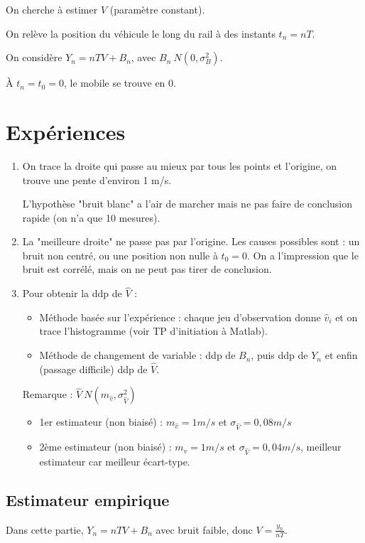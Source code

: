 \documentclass[main.tex]{subfiles}
\begin{document}
\newcommand{\snn}{\sum_n}
On cherche à estimer $V$ (paramètre constant). 

On relève la position du véhicule le long du rail à des instants $t_n=nT$.

On considère $Y_n=nTV+B_n$, avec $B_n~N(0,\sigma_B^2)$.

À $t_n=t_0=0$, le mobile se trouve en 0.

\section{Expériences}

\begin{enumerate}\setlength{\itemsep}{10mm}
\item On trace la droite qui passe au mieux par tous les points et l'origine, on trouve une pente d'environ 1 m/s.

L'hypothèse "bruit blanc" a l'air de marcher mais ne pas faire de conclusion rapide (on n'a que 10 mesures).

\item La "meilleure droite" ne passe pas par l'origine. Les causes possibles sont : un bruit non centré, ou une position non nulle à $t_0=0$. On a l'impression que le bruit est corrélé, mais on ne peut pas tirer de conclusion.

\item Pour obtenir la ddp de $\hat{V}$ :
\begin{itemize}
\item Méthode basée sur l'expérience : chaque jeu d'observation donne $\hat{v}_i$ et on trace l'histogramme (voir TP d'initiation à Matlab).
\item Méthode de changement de variable : ddp de $B_n$, puis ddp de $Y_n$ et enfin (passage difficile) ddp de $\hat{V}$.
\end{itemize}

Remarque : $\hat{V}~N(m_{\hat{v}},\sigma_{\hat{V}}^2)$
\begin{itemize}
\item 1er estimateur (non biaisé) : $m_{\hat{v}}=1m/s$ et $\sigma_{\hat{V}}=0,08m/s$
\item 2ème estimateur (non biaisé) : $m_{\hat{v}}=1m/s$ et $\sigma_{\hat{V}}=0,04m/s$, meilleur estimateur car meilleur écart-type.
\end{itemize}

\end{enumerate}

\subsection{Estimateur empirique}
Dans cette partie, $Y_n=nTV+B_n$ avec bruit faible, donc $V=\frac{y_n}{nT}$.
\end{document}
